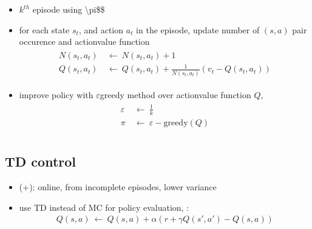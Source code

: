 \documentclass[letterpaper,10pt,english]{jupyterBook}
\begin{document}
\sphinxAtStartPar
{}
\begin{itemize}
\item {} 
\sphinxAtStartPar
\(k^{th}\) episode using \textbackslash{}pi\$\$

\item {} 
\sphinxAtStartPar
for each state \(s_t\),  and action \(a_t\) in the episode, update number of \((s,a)\) pair occurence and action\sphinxhyphen{}value function
\begin{equation*}
\begin{split}\begin{aligned}
     N(s_t, a_t) & \ \leftarrow \ N(s_t, a_t) + 1 \\
     Q(s_t, a_t) & \ \leftarrow \ Q(s_t, a_t) + \frac{1}{N(s_t, a_t)} (v_t - Q(s_t, a_t))
   \end{aligned}\end{split}
\end{equation*}
\item {} 
\sphinxAtStartPar
improve policy with \(\varepsilon\)\sphinxhyphen{}greedy method over action\sphinxhyphen{}value function \(Q\),
\begin{equation*}
\begin{split}\begin{aligned}
    \varepsilon & \ \leftarrow \ \frac{1}{k} \\
    \pi & \ \leftarrow \ \varepsilon-\text{greedy}(Q) \\
  \end{aligned}\end{split}
\end{equation*}
\end{itemize}


\subsection{TD control}
\label{\detokenize{ch/rl/mdp_sol_rl:td-control}}\label{\detokenize{ch/rl/mdp_sol_rl:rl-mdp-sol-rl-control-td}}\begin{itemize}
\item {} 
\sphinxAtStartPar
(+): online, from incomplete episodes, lower variance

\item {} 
\sphinxAtStartPar
use TD instead of MC for policy evaluation, :
\begin{equation*}
\begin{split}Q(s,a) \ \leftarrow \ Q(s,a) + \alpha \left( r + \gamma Q(s',a') - Q(s,a) \right)\end{split}
\end{equation*}
\end{itemize}
\end{document}
